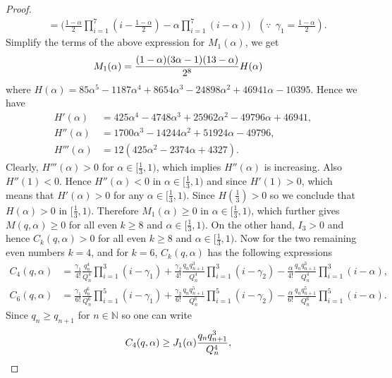 \documentclass[10pt,a4paper]{amsart}
\begin{document}
\begin{proof}
\begin{align*}
&=\Big(\frac{1-\alpha}{2}\displaystyle\prod_{i=1}^{7}(i-\frac{1-\alpha}{2})-\alpha\displaystyle\prod_{i=1}^{7}(i-\alpha)\Big)~~~(\because~~ \gamma_{1}=\frac{1-\alpha}{2}).
\end{align*}Simplify the terms of the above expression for $M_{1}(\alpha)$, we get
\begin{align}{\label{M-H-eq}}
M_{1}(\alpha)&=\frac{(1-\alpha)(3\alpha-1)(13-\alpha)}{2^{8}}H(\alpha)
\end{align}
where $H(\alpha)=85\alpha^{5}-1187\alpha^{4}+8654\alpha^{3}-24898\alpha^{2}+46941\alpha-10395$. Hence we have
\begin{align*}
H'(\alpha)&=425\alpha^{4}-4748\alpha^{3}+25962\alpha^{2}-49796\alpha+46941,\\
H''(\alpha)&=1700\alpha^{3}-14244\alpha^{2}+51924\alpha-49796,\\
H'''(\alpha)&=12(425\alpha^{2}-2374\alpha+4327).
\end{align*}
Clearly, $H'''(\alpha)>0$ for $\alpha\in[\frac{1}{3}, 1)$, which implies $H''(\alpha)$ is increasing. Also $H''(1)<0$. Hence $H''(\alpha)<0$ in $\alpha\in[\frac{1}{3}, 1)$ and since $H'(1)>0$, which means that $H'(\alpha)>0$ for any $\alpha\in[\frac{1}{3},1)$. Since $H(\frac{1}{3})>0$ so we conclude that $H(\alpha)>0$ in $[\frac{1}{3}, 1)$. Therefore $M_{1}(\alpha)\geq0$ in $\alpha\in[\frac{1}{3},1)$, which further gives $M(q,\alpha)\geq0$ for all even $k\geq8$ and $\alpha\in[\frac{1}{3},1)$. On the other hand, $I_{3}>0$ and hence  $C_{k}(q,\alpha)>0$ for all even $k\geq8$ and $\alpha\in[\frac{1}{3},1)$. Now for the two remaining even numbers $k=4$, and for $k=6$, $C_{k}(q,\alpha)$ has the following expressions
\begin{align*}
C_{4}(q,\alpha)&=\frac{\gamma_{1}}{4!}\frac{q_{n}^{4}}{Q_{n}^{4}}\displaystyle\prod_{i=1}^{3}(i-\gamma_{1})+
\frac{\gamma_{2}}{4!}\frac{q_{n}q_{n+1}^{3}}{Q_{n}^{4}}\displaystyle\prod_{i=1}^{3}
(i-\gamma_{2})-\frac{\alpha}{4!}\frac{q_{n}q_{n+1}^{3}}{Q_{n}^{4}}\displaystyle\prod_{i=1}^{3}(i-\alpha),\\
C_{6}(q,\alpha)&=\frac{\gamma_{1}}{6!}\frac{q_{n}^{6}}{Q_{n}^{6}}\displaystyle\prod_{i=1}^{5}(i-\gamma_{1})+
\frac{\gamma_{2}}{6!}\frac{q_{n}q_{n+1}^{5}}{Q_{n}^{6}}\displaystyle\prod_{i=1}^{5}
(i-\gamma_{2})-\frac{\alpha}{6!}\frac{q_{n}q_{n+1}^{5}}{Q_{n}^{6}}\displaystyle\prod_{i=1}^{5}(i-\alpha).
\end{align*}
Since $q_{n}\geq q_{n+1}$ for $n\in\mathbb{N}$ so one can write
\begin{align}{\label{c-4}}
C_{4}(q,\alpha)&\geq J_{1}(\alpha)\frac{q_{n}q_{n+1}^{3}}{Q_{n}^{4}},

\end{align}
\end{proof}
\end{document}
